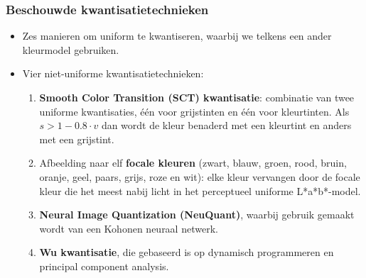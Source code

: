 \documentclass[dutch]{beamer}
\theoremstyle{definition}
\theoremstyle{remark}
\theoremstyle{example}
\begin{document}
{
  \frametitle{Beschouwde kwantisatietechnieken}
  
  \begin{itemize}
  \item Zes manieren om uniform te kwantiseren, waarbij we telkens een ander
  kleurmodel gebruiken.
  \item Vier niet-uniforme kwantisatietechnieken:
  \begin{enumerate}
    \item \textbf{Smooth Color Transition (SCT) kwantisatie}: combinatie van twee uniforme
    kwantisaties, \'e\'en voor grijstinten en \'e\'en voor kleurtinten. Als 
    $s > 1 - 0.8\cdot v$ dan wordt de kleur benaderd met een kleurtint en anders met een
    grijstint.
    \item Afbeelding naar elf \textbf{focale kleuren} ({\color{zwart}zwart}, 
    {\color{blauw}blauw}, {\color{groen}groen}, {\color{rood}rood}, 
    {\color{bruin}bruin}, {\color{oranje}oranje}, {\color{geel}geel}, 
    {\color{paars}paars}, {\color{grijs}grijs}, {\color{roze}roze} en {\color{wit}wit}): 
    elke kleur vervangen door de focale kleur die het meest
    nabij licht in het perceptueel uniforme L*a*b*-model.
    \item \textbf{Neural Image Quantization (NeuQuant)}, waarbij gebruik gemaakt wordt van een 
    Kohonen neuraal netwerk.
    \item \textbf{Wu kwantisatie}, die gebaseerd is op dynamisch programmeren en principal 
    component analysis.
  \end{enumerate}
  \end{itemize}
}
\frame
\end{document}
